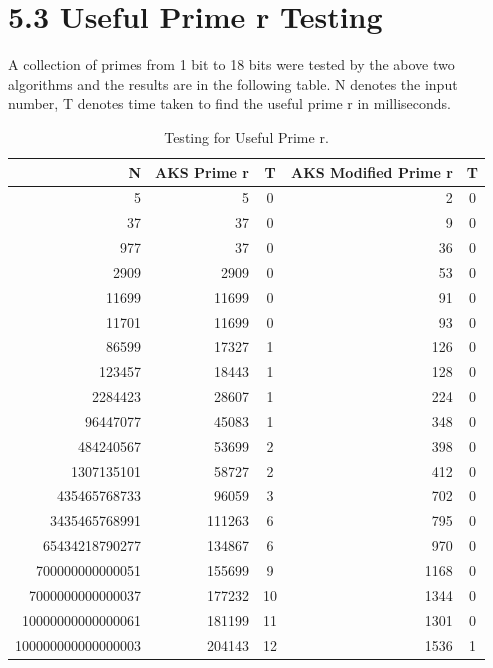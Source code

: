\documentclass[a4paper,12pt]{article}
\begin{document}
\newpage
{}
\section*{\large 5.3 Useful Prime r Testing}

\begin{flushleft}
	A collection of primes from 1 bit to 18 bits were tested by the above two algorithms and the results are in the following table. N denotes the input number, T denotes time taken to find the useful prime r in milliseconds.
\end{flushleft}

\begin{table}[h!]
\centering
\caption{Testing for Useful Prime r.}
\label{tab:table1}
\vspace{0.05in}
\begin{tabular}{|r|r|c|r|c|}
\hline
\ N & AKS Prime r &  T & AKS Modified Prime r & T \\
\hline
5 & 5 & 0 & 2 & 0\\
37 & 37 & 0 & 9 & 0\\
977 & 37 & 0 & 36 & 0\\
2909 & 2909 & 0 & 53 & 0\\
11699 & 11699 & 0 & 91 & 0\\
11701 & 11699 & 0 & 93 & 0\\
86599 & 17327 & 1 & 126 & 0\\
123457 & 18443 & 1 & 128 & 0\\
2284423 & 28607 & 1 & 224 & 0\\
96447077 & 45083 & 1 & 348 & 0\\
484240567 & 53699 & 2 & 398 & 0\\
1307135101 & 58727 & 2 & 412 & 0\\
435465768733 & 96059 & 3 & 702 & 0\\
3435465768991 & 111263 & 6 & 795 & 0\\
65434218790277 & 134867 & 6 & 970 & 0\\
700000000000051 & 155699 & 9 & 1168 & 0\\
7000000000000037 & 177232 & 10 & 1344 & 0\\
10000000000000061 & 181199 & 11 & 1301 & 0\\
100000000000000003 & 204143 & 12 & 1536 & 1\\
\hline
\end{tabular}
\end{table}
\end{document}
